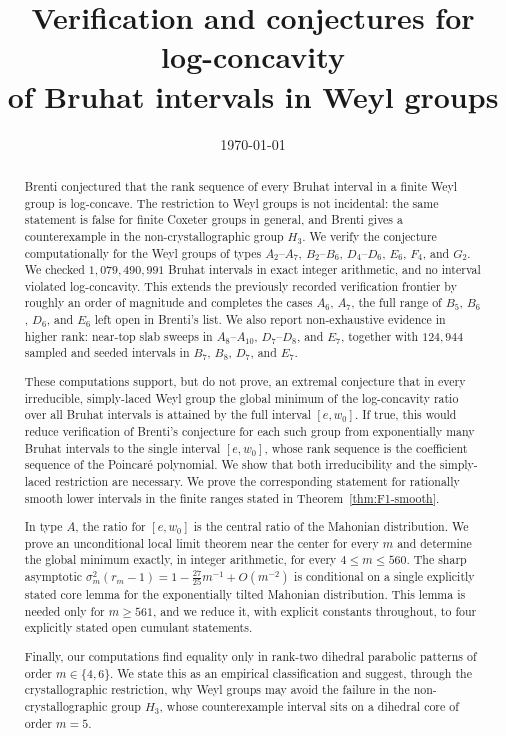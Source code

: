 \documentclass[11pt]{amsart}
\title[Log-concavity of Bruhat intervals in Weyl groups]
{Verification and conjectures for log-concavity\\ of Bruhat intervals in Weyl groups}
\author{}
\date{\today}
\theoremstyle{plain}
\theoremstyle{definition}
\theoremstyle{remark}
\begin{document}
\begin{abstract}
Brenti conjectured that the rank sequence of every Bruhat interval in a
finite Weyl group is log-concave. The restriction to Weyl groups is not
incidental: the same statement is false for finite Coxeter groups in
general, and Brenti gives a counterexample in the non-crystallographic
group $H_3$. We verify the conjecture
computationally for the Weyl groups of types $A_2$--$A_7$, $B_2$--$B_6$,
$D_4$--$D_6$, $E_6$, $F_4$, and $G_2$. We checked
$1{,}079{,}490{,}991$ Bruhat intervals in exact integer arithmetic, and no
interval violated log-concavity. This extends the previously recorded
verification frontier by roughly an order of magnitude and completes the
cases $A_6$, $A_7$, the full range of $B_5$, $B_6$, $D_6$, and $E_6$ left
open in Brenti's list. We also report non-exhaustive evidence in higher rank:
near-top slab sweeps in $A_8$--$A_{10}$, $D_7$--$D_8$, and $E_7$, together
with $124{,}944$ sampled and seeded intervals in $B_7$, $B_8$, $D_7$, and
$E_7$.

These computations support, but do not prove, an extremal conjecture that in every irreducible,
simply-laced Weyl group the global minimum of the
log-concavity ratio over all Bruhat intervals is attained by the full
interval $[e,w_0]$. If true, this would reduce verification of Brenti's
conjecture for each such group from exponentially many Bruhat intervals to
the single interval $[e,w_0]$, whose rank sequence is the coefficient
sequence of the Poincar\'e polynomial. We show that both irreducibility and
the simply-laced restriction are necessary. We prove the corresponding
statement for rationally smooth lower intervals in the finite ranges stated
in Theorem~\ref{thm:F1-smooth}.

In type $A$, the ratio for $[e,w_0]$ is the central ratio of the Mahonian
distribution. We prove an unconditional local limit theorem near the center
for every $m$ and determine the global minimum exactly, in integer
arithmetic, for every $4\le m\le560$. The sharp asymptotic
$\sigma_m^2(r_m-1) = 1-\tfrac{27}{25}m^{-1}+O(m^{-2})$ is conditional on a
single explicitly stated core lemma for the exponentially tilted Mahonian
distribution. This lemma is needed only for $m\ge561$, and we reduce it,
with explicit constants throughout, to four explicitly stated open
cumulant statements.

Finally, our computations find equality only in rank-two dihedral parabolic
patterns of order $m\in\{4,6\}$. We state this as an empirical
classification and suggest, through the crystallographic restriction, why
Weyl groups may avoid the failure in the non-crystallographic group $H_3$,
whose counterexample interval sits on a dihedral core of order $m=5$.
\end{abstract}
\end{document}

